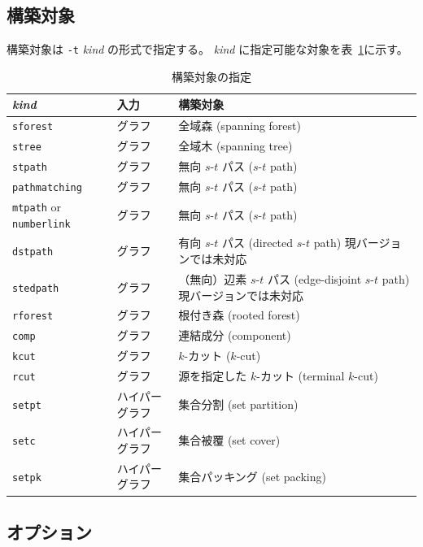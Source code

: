 \documentclass{jsarticle}
\begin{document}
\subsection{構築対象}

構築対象は \texttt{-t} \textit{kind} の形式で指定する。
\textit{kind} に指定可能な対象を表~\ref{tab:kind}に示す。

\begin{table}
\caption{構築対象の指定}
\label{tab:kind}
\begin{center}
\begin{tabular}[t]{|l|l|l|}
\hline
\textit{kind} & 入力 & 構築対象 \\ \hline \hline
\texttt{sforest} & グラフ &全域森 (spanning forest) \\ \hline
\texttt{stree} & グラフ & 全域木 (spanning tree) \\ \hline
\texttt{stpath} & グラフ & 無向 $s$-$t$ パス ($s$-$t$ path) \\ \hline
\texttt{pathmatching} & グラフ & 無向 $s$-$t$ パス ($s$-$t$ path) \\ \hline
\texttt{mtpath} or \texttt{numberlink} & グラフ & 無向 $s$-$t$ パス ($s$-$t$ path) \\ \hline
\texttt{dstpath} & グラフ & 有向 $s$-$t$ パス (directed $s$-$t$ path) 現バージョンでは未対応 \\ \hline
\texttt{stedpath} & グラフ & （無向）辺素 $s$-$t$ パス (edge-disjoint $s$-$t$ path) 現バージョンでは未対応 \\ \hline
\texttt{rforest} & グラフ & 根付き森 (rooted forest) \\ \hline
\texttt{comp} & グラフ & 連結成分 (component) \\ \hline
\texttt{kcut} & グラフ & $k$-カット ($k$-cut) \\ \hline
\texttt{rcut} & グラフ & 源を指定した $k$-カット (terminal $k$-cut) \\ \hline
\texttt{setpt} & ハイパーグラフ & 集合分割 (set partition) \\ \hline
\texttt{setc} & ハイパーグラフ & 集合被覆 (set cover) \\ \hline
\texttt{setpk} & ハイパーグラフ & 集合パッキング (set packing) \\
\hline
\end{tabular}
\end{center}
\end{table}

\subsection{オプション}
\end{document}
